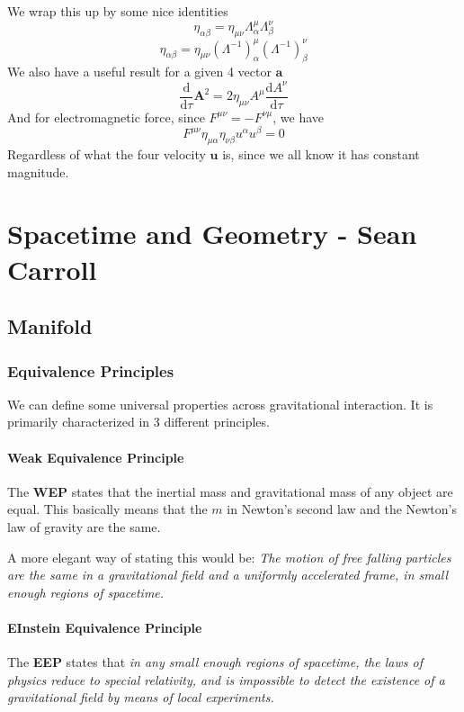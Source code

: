 \documentclass[12pt]{book}
\newcommand{\dydx}[2]{\frac{\text{d} #1}{\text{d} #2}}
\newcommand{\paren}[1]{\left( #1 \right)}
\newcommand{\etensor}[3]{#1_{#3}^{#2}}
\begin{document}
We wrap this up by some nice identities
\[
\eta_{\alpha\beta}=\eta_{\mu\nu}\etensor{\Lambda}{\mu}{\alpha}\etensor{\Lambda}{\nu}{\beta}
\]
\[
\eta_{\alpha\beta}=\eta_{\mu\nu}\etensor{\paren{\Lambda^{-1}}}{\mu}{\alpha}\etensor{\paren{\Lambda^{-1}}}{\nu}{\beta}
\]
We also have a useful result for a given 4 vector $\mathbf{a}$
\[
\dydx{}{\tau}\mathbf{A}^2 = 2\eta_{\mu\nu}A^{\mu}\dydx{A^{\nu}}{\tau}
\]
And for electromagnetic force, since $F^{\mu\nu} = -F^{\nu\mu}$, we have
\[
F^{\mu\nu}\eta_{\mu\alpha}\eta_{\nu\beta}u^{\alpha}u^{\beta} = 0
\]
Regardless of what the four velocity $\mathbf{u}$ is, since we all know it has constant magnitude. 

\section{}

\chapter{Spacetime and Geometry - Sean Carroll}
\section{Manifold}
\subsection{Equivalence Principles}
We can define some universal properties across gravitational interaction. It is primarily characterized in 3 different principles.
\subsubsection{Weak Equivalence Principle}
The \textbf{WEP} states that the inertial mass and gravitational mass of any object are equal. This basically means that the $m$ in Newton's second law and the Newton's law of gravity are the same.

A more elegant way of stating this would be: \textit{The motion of free falling particles are the same in a gravitational field and a uniformly accelerated frame, in small enough regions of spacetime.}

\subsubsection{EInstein Equivalence Principle}
The \textbf{EEP} states that \textit{in any small enough regions of spacetime, the laws of physics reduce to special relativity, and is impossible to detect the existence of a gravitational field by means of local experiments.}
\end{document}
